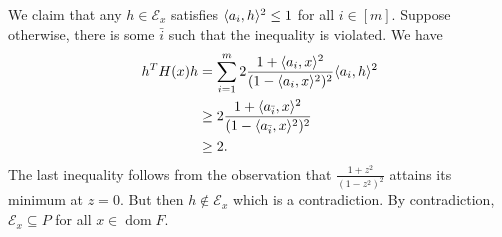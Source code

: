 \documentclass[10pt]{article}
\DeclarePairedDelimiter{\iprod}{\langle}{\rangle}
\DeclareMathOperator{\dom}{dom}
\newcommand{\sset}{\subseteq}
\newcommand{\mcal}{\mathcal}
\begin{document}
We claim that any $h\in \mcal E_x$ satisfies $\iprod{a_i, h}^2\leq 1$ for all $i\in [m]$.
Suppose otherwise,
there is some $\bar i$ such that the inequality is violated.
We have
\begin{align*}
  h^TH(x)h
  &= \sum_{i=1}^m 2\frac{1+\iprod{a_i, x}^2}{(1-\iprod{a_i, x}^2)^2} \iprod{a_i, h}^2 \\
  &\geq 2\frac{1+\iprod{a_{\bar i}, x}^2}{(1-\iprod{a_{\bar i}, x}^2)^2} \\
  &\geq 2.
\end{align*}
The last inequality follows from the observation that $\frac{1+z^2}{(1-z^2)^2}$ attains its minimum at $z=0$.
But then $h\notin \mcal E_x$ which is a contradiction.
By contradiction,
$\mcal E_x\sset P$ for all $x\in \dom F$.
\end{document}
